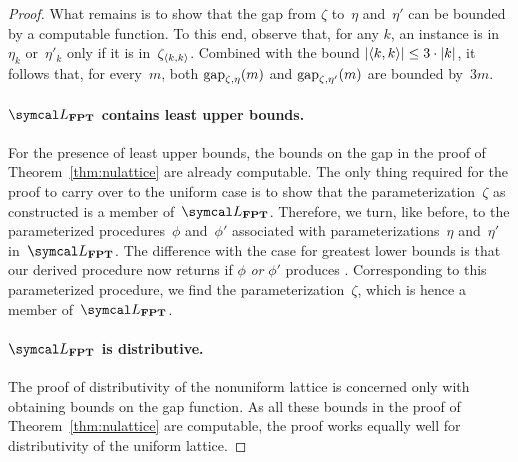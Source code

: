 \begin{proof}
  What remains is to show that the gap from $\zeta$ to~$\eta$ and~$\eta'$ can be bounded by a computable function.
  To this end, observe that, for any $k$, an instance is in~$\eta_k$ or~$\eta'_k$ only if it is in~$\zeta_{{\langle k, k\rangle}}$.
  Combined with the bound ${\lvert{\langle k, k\rangle}\rvert} \le 3 \cdot {\lvert k\rvert}$, it follows that, for every~$m$, both $\operatorname{gap}_{\zeta, \eta}(m)$ and $\operatorname{gap}_{\zeta, \eta'}(m)$ are bounded by~$3m$.

  \paragraph{$\calL_\cl{FPT}$ contains least upper bounds.}
  For the presence of least upper bounds, the bounds on the gap in the proof of Theorem~\ref{thm:nulattice} are already computable.
  The only thing required for the proof to carry over to the uniform case is to show that the parameterization~$\zeta$ as constructed is a member of~$\calL_\cl{FPT}$.
  Therefore, we turn, like before, to the parameterized procedures~$\phi$ and~$\phi'$ associated with parameterizations~$\eta$ and~$\eta'$ in~$\calL_\cl{FPT}$.
  The difference with the case for greatest lower bounds is that our derived  procedure now returns  if $\phi$ \emph{or} $\phi'$ produces .
  Corresponding to this parameterized procedure, we find the parameterization~$\zeta$, which is hence a member of~$\calL_\cl{FPT}$.

  \paragraph{$\calL_\cl{FPT}$ is distributive.}
  The proof of distributivity of the nonuniform lattice is concerned only with obtaining bounds on the gap function.
  As all these bounds in the proof of Theorem~\ref{thm:nulattice} are computable, the proof works equally well for distributivity of the uniform lattice.
\end{proof}

